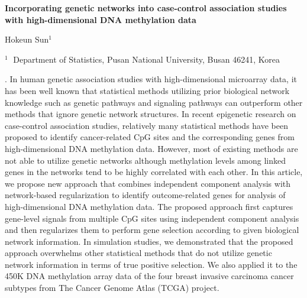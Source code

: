 \documentclass[12pt]{article}
\begin{document}
\begin{flushleft}


{\LARGE\bf Incorporating genetic networks into case-control association studies with high-dimensional DNA methylation data}


\vspace{1.0cm}

Hokeun Sun$^1$

\begin{description}

\item $^1 \;$ Department of Statistics, Pusan National University, 
Busan 46241, Korea


\end{description}

\end{flushleft}


\vspace{0.75cm}

. In human genetic association studies with high-dimensional microarray data, it has been well known that statistical methods utilizing prior biological network knowledge such as genetic pathways and signaling pathways can outperform other methods that ignore genetic network structures. In recent epigenetic research on case-control association studies, relatively many statistical methods have been proposed to identify cancer-related CpG sites and the corresponding genes from high-dimensional DNA methylation data. However, most of existing methods are not able to utilize genetic networks although methylation levels among linked genes in the networks tend to be highly correlated with each other. In this article, we propose new approach that combines independent component analysis with network-based regularization to identify outcome-related genes for analysis of high-dimensional DNA methylation data. The proposed approach first captures gene-level signals from multiple CpG sites using independent component analysis and then regularizes them to perform gene selection according to given biological network information. In simulation studies, we demonstrated that the proposed approach overwhelms other statistical methods that do not utilize genetic network information in terms of true positive selection. We also applied it to the 450K DNA methylation array data of the four breast invasive carcinoma cancer subtypes from The Cancer Genome Atlas (TCGA) project.
\end{document}
